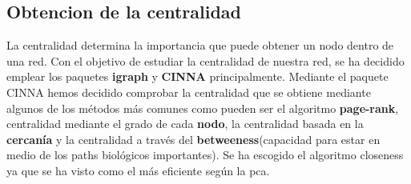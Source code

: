 \subsection{Obtencion de la centralidad}
La centralidad determina la importancia que puede obtener un nodo dentro de una red.
Con el objetivo de estudiar la centralidad de nuestra red, se ha decidido emplear los paquetes \textbf{igraph} y \textbf{CINNA} principalmente.
Mediante el paquete CINNA hemos decidido comprobar la centralidad que se obtiene mediante algunos de los métodos más comunes como pueden ser el algoritmo \textbf{page-rank}, centralidad mediante el grado de cada \textbf{nodo}, la centralidad basada en la \textbf{cercanía} y la centralidad a través del \textbf{betweeness}(capacidad para estar en medio de los paths biológicos importantes).
Se ha escogido el algoritmo closeness ya que se ha visto como el más eficiente según la pca.


